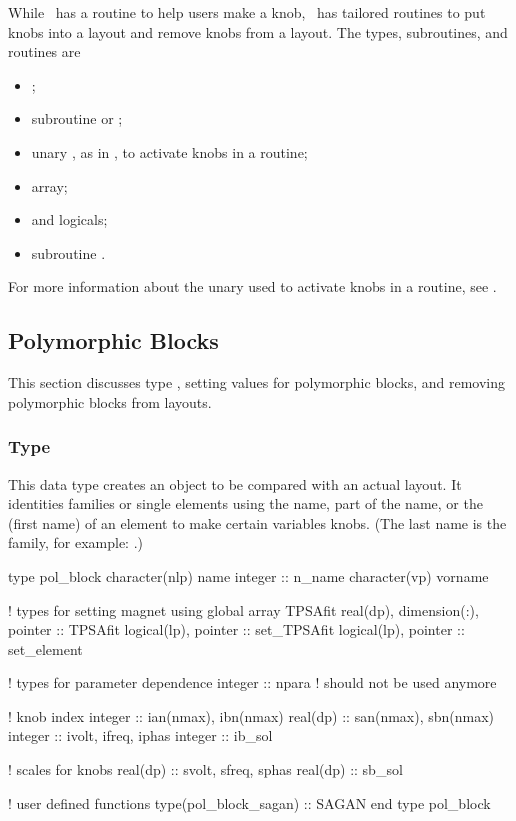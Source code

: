 %
While \FPP\ has a routine to help users make a knob, \PTC\ has tailored
routines to put knobs into a layout and remove knobs from a layout.
%
%
The types, subroutines, and routines are
\begin{itemize}
  \item {};
  \item subroutine  or ;
  \item unary \ptc{+}, as in , to activate knobs in a  routine;
  \item {} array;
  \item {} and  logicals;
  \item subroutine .
\end{itemize}
For more information about the unary \ptc{+} used to activate knobs in
a  routine, see .


\subsection{Polymorphic Blocks}

%
This section discusses type , setting values for
polymorphic blocks, and removing polymorphic blocks from layouts.


\subsubsection{Type }

%
This data type creates an object to be compared with an actual layout. It identities families or single elements using the name, part of the name, or the  (first name) of an element to make certain variables knobs. (The last name is the family, for example: .)

\begin{ptccode}
type pol_block
  character(nlp) name
  integer :: n_name
  character(vp) vorname

  ! types for setting magnet using global array TPSAfit
  real(dp), dimension(:), pointer :: TPSAfit
  logical(lp), pointer :: set_TPSAfit
  logical(lp), pointer :: set_element

  ! types for parameter dependence
  integer :: npara ! should not be used anymore

  ! knob index
  integer ::  ian(nmax), ibn(nmax)
  real(dp) :: san(nmax), sbn(nmax)
  integer :: ivolt, ifreq, iphas
  integer :: ib_sol

  ! scales for knobs
  real(dp) :: svolt, sfreq, sphas
  real(dp) :: sb_sol

  ! user defined functions
  type(pol_block_sagan) :: SAGAN
end type pol_block
\end{ptccode}

